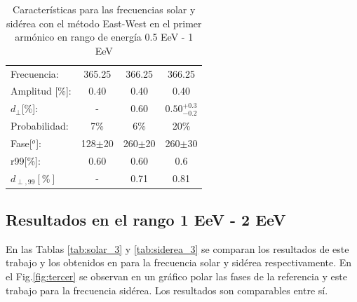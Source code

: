 \begin{table}[H]
        \begin{small}
            \begin{center}
                \begin{tabular}[c]{l|c||c|c}
                    Frecuencia:     & 365.25	    & 366.25		& 366.25\cite{Aab_2020}\\
                    Amplitud [\%]:  & 0.40          & 0.40	        & 0.40\\
                    $d_\perp$[\%]:  & -             & 0.60          & $0.50^{+0.3}_{-0.2}$\\
                    Probabilidad:   & 7\%           & 6\%	        & 20\%\\
                    Fase[$^o$]:     & 128$\pm$20	& 260$\pm$20	& 260$\pm$30\\
                    r99[\%]:        & 0.60	        & 0.60          & 0.6\\
                    $d_{\perp,99}[\%]$  & -         & 0.71          & 0.81\\
                \end{tabular}
            \end{center}
        \end{small}
        \caption{Características para las frecuencias solar y sidérea con el método East-West en el primer armónico en rango de energía 0.5 EeV - 1 EeV}
        \label{tab:solar}
    \end{table}

    


\subsection*{Resultados en el rango 1 EeV - 2 EeV}

 
En las Tablas \ref{tab:solar_3} y \ref{tab:siderea_3} se comparan los resultados de este trabajo y los obtenidos en \cite{Aab_2020} para la frecuencia solar y sidérea respectivamente. En el Fig.\ref{fig:tercer} se observan en un gráfico polar las fases de la referencia y este trabajo para la frecuencia sidérea. Los resultados son comparables entre sí.
    
